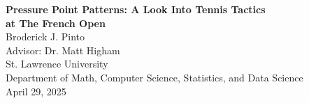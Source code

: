 \begin{titlepage}
\begin{center}
\vspace*{2cm}

{\LARGE \textbf{Pressure Point Patterns: A Look Into Tennis Tactics\\[0.5em]
at The French Open}}\\[3em]

{\Large Broderick J. Pinto}\\[1ex]
Advisor: Dr. Matt Higham\\[1ex]
St. Lawrence University\\
Department of Math, Computer Science, Statistics, and Data Science\\[3ex]
April 29, 2025

\vfill
\end{center}
\end{titlepage}
\clearpage
